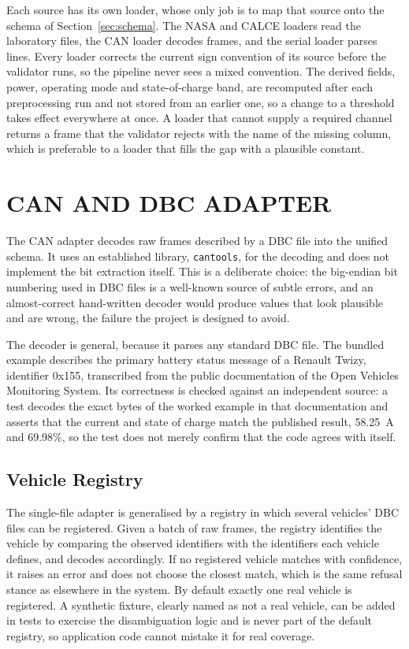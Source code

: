 \documentclass[12pt,a4paper]{amritareport}
\begin{document}
Each source has its own loader, whose only job is to map that source onto the schema of Section~\ref{sec:schema}. The NASA and CALCE loaders read the laboratory files, the CAN loader decodes frames, and the serial loader parses lines. Every loader corrects the current sign convention of its source before the validator runs, so the pipeline never sees a mixed convention. The derived fields, power, operating mode and state-of-charge band, are recomputed after each preprocessing run and not stored from an earlier one, so a change to a threshold takes effect everywhere at once. A loader that cannot supply a required channel returns a frame that the validator rejects with the name of the missing column, which is preferable to a loader that fills the gap with a plausible constant.

\section{CAN AND DBC ADAPTER}

The CAN adapter decodes raw frames described by a DBC file into the unified schema. It uses an established library, \texttt{cantools}, for the decoding and does not implement the bit extraction itself. This is a deliberate choice: the big-endian bit numbering used in DBC files is a well-known source of subtle errors, and an almost-correct hand-written decoder would produce values that look plausible and are wrong, the failure the project is designed to avoid.

The decoder is general, because it parses any standard DBC file. The bundled example describes the primary battery status message of a Renault Twizy, identifier 0x155, transcribed from the public documentation of the Open Vehicles Monitoring System. Its correctness is checked against an independent source: a test decodes the exact bytes of the worked example in that documentation and asserts that the current and state of charge match the published result, 58.25~A and 69.98\%, so the test does not merely confirm that the code agrees with itself.

\subsection{Vehicle Registry}

The single-file adapter is generalised by a registry in which several vehicles' DBC files can be registered. Given a batch of raw frames, the registry identifies the vehicle by comparing the observed identifiers with the identifiers each vehicle defines, and decodes accordingly. If no registered vehicle matches with confidence, it raises an error and does not choose the closest match, which is the same refusal stance as elsewhere in the system. By default exactly one real vehicle is registered. A synthetic fixture, clearly named as not a real vehicle, can be added in tests to exercise the disambiguation logic and is never part of the default registry, so application code cannot mistake it for real coverage.
\end{document}
